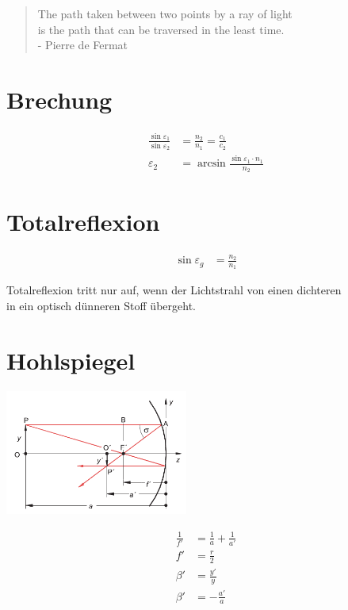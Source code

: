 \begin{quote}
The path taken between two points by a ray of light\\is the path that can be traversed in the least time.\\- Pierre de Fermat
\end{quote}  

\begin{multicols}{2}
\section{Brechung}
\begin{align*}
\frac{\sin{\varepsilon_1}}{\sin{\varepsilon_2}}&=\frac{n_2}{n_1}=\frac{c_1}{c_2}\\
\varepsilon_2&=\arcsin{\frac{\sin{\varepsilon_1}\cdot n_1}{n_2}}
\end{align*}

\section{Totalreflexion}
\begin{align*}
\sin{\varepsilon_g}&=\frac{n_2}{n_1}
\end{align*}
\end{multicols}

Totalreflexion tritt nur auf, wenn der Lichtstrahl von einen dichteren \\ in ein optisch dünneren Stoff übergeht.

\section{Hohlspiegel}
\begin{multicols}{2}
\begin{center}
 \includegraphics[width=60mm,keepaspectratio=true]{./Physik/Bilder/Hohlspiegel.png}
\end{center}

\begin{align*}
\frac{1}{f'}&=\frac{1}{a}+\frac{1}{a'}\\
f'&=\frac{r}{2}\\
\beta'&=\frac{y'}{y}\\
\beta'&=-\frac{a'}{a}
\end{align*}
\end{multicols}

